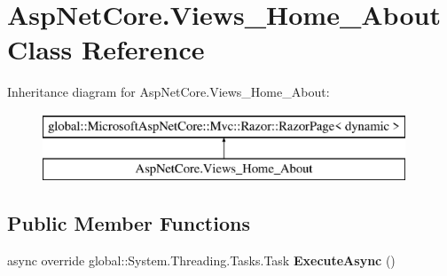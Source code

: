 \hypertarget{class_asp_net_core_1_1_views___home___about}{}\section{Asp\+Net\+Core.\+Views\+\_\+\+Home\+\_\+\+About Class Reference}
\label{class_asp_net_core_1_1_views___home___about}
Inheritance diagram for Asp\+Net\+Core.\+Views\+\_\+\+Home\+\_\+\+About\+:\begin{figure}[H]
\begin{center}
\leavevmode
\includegraphics[height=2.000000cm]{class_asp_net_core_1_1_views___home___about}
\end{center}
\end{figure}
\subsection*{Public Member Functions}
\begin{DoxyCompactItemize}
\item 
\mbox{\label{class_asp_net_core_1_1_views___home___about_a75acd1e715143d403aa42e88cb66d0fd}} 
async override global\+::\+System.\+Threading.\+Tasks.\+Task {\bfseries Execute\+Async} ()
\end{DoxyCompactItemize}
